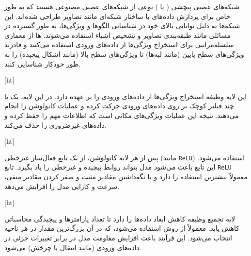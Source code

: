 
\label{فصل۲:مفاهیم اولیه}

شبکه‌های عصبی پیچشی ( یا ) نوعی از شبکه‌های عصبی مصنوعی هستند که به طور خاص برای پردازش داده‌های با ساختار شبکه‌ای مانند تصاویر طراحی شده‌اند. این شبکه‌ها به دلیل توانایی بالای خود در شناسایی الگوها و ویژگی‌ها، به طور گسترده در مسائلی مانند طبقه‌بندی تصاویر  و تشخیص اشیاء استفاده می‌شوند. ها از معماری سلسله‌مراتبی برای استخراج ویژگی‌ها از داده‌های ورودی استفاده می‌کنند و قادرند ویژگی‌های سطح پایین (مانند لبه‌ها) تا ویژگی‌های سطح بالا (مانند اشکال پیچیده) را به طور خودکار شناسایی کنند.



[ht]




این لایه وظیفه استخراج ویژگی‌ها از داده‌های ورودی را بر عهده دارد. در این لایه، یک یا چند فیلتر کوچک بر روی داده‌های ورودی حرکت کرده و عملیات کانولوشن را انجام می‌دهند. نتیجه این عملیات ویژگی‌های مکانی است که اطلاعات مهم را حفظ کرده و داده‌های غیرضروری را حذف می‌کند.


[ht]





پس از هر لایه کانولوشن، از یک تابع فعال‌ساز غیرخطی (مانند \texttt{ReLU}) استفاده می‌شود. این تابع باعث می‌شود مدل بتواند روابط پیچیده و غیرخطی را یاد بگیرد. تابع \texttt{ReLU} معمولاً بیشترین استفاده را دارد و با نگه‌داشتن مقادیر مثبت و صفر کردن مقادیر منفی، سرعت و کارایی مدل را افزایش می‌دهد.

[ht]



لایه تجمیع وظیفه کاهش ابعاد داده‌ها را دارد تا تعداد پارامترها و پیچیدگی محاسباتی کاهش یابد. معمولاً از روش  استفاده می‌شود، که در آن بزرگ‌ترین مقدار در هر ناحیه انتخاب می‌شود. این فرآیند باعث افزایش مقاومت مدل در برابر تغییرات جزئی در داده‌های ورودی (مانند انتقال یا چرخش) می‌شود.


